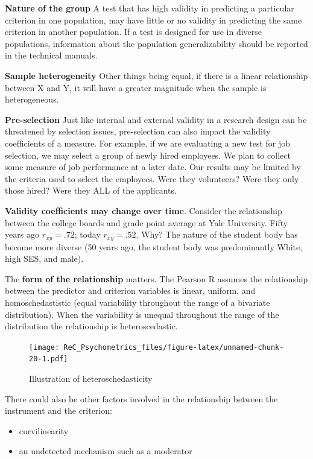 \documentclass[
  english,
]{book}
\providecommand{\tightlist}{%
  \setlength{\itemsep}{0pt}\setlength{\parskip}{0pt}}
\begin{document}
\textbf{Nature of the group} A test that has high validity in predicting a particular criterion in one population, may have little or no validity in predicting the same criterion in another population. If a test is designed for use in diverse populations, information about the population generalizability should be reported in the technical manuals.

\textbf{Sample heterogeneity} Other things being equal, if there is a linear relationship between X and Y, it will have a greater magnitude when the sample is heterogeneous.

\textbf{Pre-selection} Just like internal and external validity in a research design can be threatened by selection issues, pre-selection can also impact the validity coefficients of a measure. For example, if we are evaluating a new test for job selection, we may select a group of newly hired employees. We plan to collect some measure of job performance at a later date. Our results may be limited by the criteria used to select the employees. Were they volunteers? Were they only those hired? Were they ALL of the applicants.

\textbf{Validity coefficients may change over time}. Consider the relationship between the college boards and grade point average at Yale University. Fifty years ago \(r_{xy} = .72\); today \(r_{xy} = .52\). Why? The nature of the student body has become more diverse (50 years ago, the student body was predominantly White, high SES, and male).

The \textbf{form of the relationship} matters. The Pearson R assumes the relationship between the predictor and criterion variables is linear, uniform, and homoschedastistic (equal variability throughout the range of a bivariate distribution). When the variability is unequal throughout the range of the distribution the relationship is heteroscedastic.

\begin{figure}
\centering
\texttt{[image: ReC\_Psychometrics\_files/figure-latex/unnamed-chunk-20-1.pdf]}
\caption{\label{fig:unnamed-chunk-20}Illustration of heteroschedasticity}
\end{figure}

There could also be other factors involved in the relationship between the instrument and the criterion:

\begin{itemize}
\tightlist
\item
  curvilinearity
\item
  an undetected mechanism such as a moderator
\end{itemize}
\end{document}
